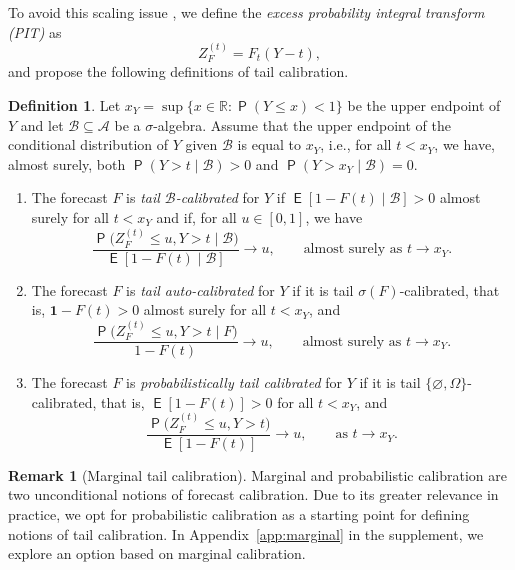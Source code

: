 \documentclass[12pt]{article}
\newcommand{\E}{\operatorname{\mathsf{E}}}
\newcommand{\Q}{\operatorname{\mathsf{P}}}
\newcommand{\R}{\mathbb{R}}
\newcommand{\Aa}{\mathcal{A}}
\newcommand{\Bb}{\mathcal{B}}
\newcommand{\1}{\mathbf{1}} %
\newcommand{\ZFt}{Z_{F}^{(t)}} %
\theoremstyle{definition}
\newtheorem{defin}[propo]{Definition}
\newtheorem{remark}[propo]{Remark}
\begin{document}
To avoid this scaling issue , we define the \emph{excess probability integral transform (PIT)} as
\begin{equation}\label{eq:exPIT}
\ZFt = F_{t}(Y - t),
\end{equation}
and propose the following definitions of tail calibration.


\begin{defin}\label{def:TAC_new}
Let $x_Y = \sup \{ x \in \R : \Q(Y \le x) < 1 \}$ be the upper endpoint of $Y$ and let $\Bb \subseteq \Aa$ be a $\sigma$-algebra. Assume that the upper endpoint of the conditional distribution of $Y$ given $\Bb$ is equal to $x_Y$, i.e., for all $t < x_Y$, we have, almost surely, both $\Q(Y > t \mid \Bb) > 0$ and $\Q(Y > x_Y \mid \Bb) = 0$. 
\begin{enumerate}
    \item[(a)] The forecast $F$ is \emph{tail $\Bb$-calibrated} for $Y$ if $\E[1 - F(t) \mid \Bb] > 0$ almost surely for all $t < x_Y$ and if, for all $u \in [0,1]$, we have
    \begin{equation}
    	\label{eq:tailBCt}
    	\frac{\Q\bigl(\ZFt \le u, Y > t \mid \Bb\bigr)}{\E[1 - F(t) \mid \Bb]} \to u, 
    	\qquad \text{almost surely as $t \to x_Y$.}
    \end{equation}

    \item[(b)] The forecast $F$ is \emph{tail auto-calibrated} for $Y$ if it is tail $\sigma(F)$-calibrated, that is, $\1 - F(t) > 0$ almost surely for all $t < x_Y$, and
    \begin{equation*}
    	\frac{\Q\bigl(\ZFt \le u, Y > t \mid F\bigr)}{1 - F(t)} \to u, 
    	\qquad \text{almost surely as $t \to x_Y$.}
    \end{equation*}

    \item[(c)] The forecast $F$ is \emph{probabilistically tail calibrated} for $Y$ if it is tail $\{ \varnothing, \Omega \}$-calibrated, that is, $\E[1 - F(t)] > 0$ for all $t < x_Y$, and
    \begin{equation*}
    	\frac{\Q\bigl(\ZFt \le u, Y > t\bigr)}{\E[1 - F(t)]} \to u, 
    	\qquad \text{as $t \to x_Y$.}
    \end{equation*}
\end{enumerate}

\end{defin}

\begin{remark}[Marginal tail calibration]
	\label{rem:marginal}
    Marginal and probabilistic calibration are two unconditional notions of forecast calibration. Due to its greater relevance in practice, we opt for probabilistic calibration as a starting point for defining notions of tail calibration. In Appendix~\ref{app:marginal} in the supplement, we explore an option based on marginal calibration. 
\end{remark}
\end{document}
